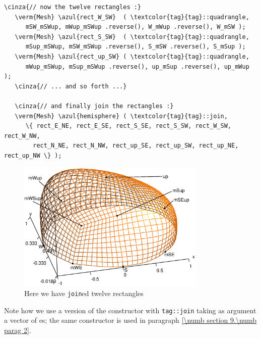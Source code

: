 \begin{Verbatim}[commandchars=\\\{\},formatcom=\small\tt,frame=single,
   label=parag-\ref{\numb section 2.\numb parag 7}.cpp,rulecolor=\color{coment},
   baselinestretch=0.94,framesep=2mm]
   \cinza{// now the twelve rectangles :}
   \verm{Mesh} \azul{rect_W_SW}  ( \textcolor{tag}{tag}::quadrangle,
      mSW_mSWup, mWup_mSWup .reverse(), W_mWup .reverse(), W_mSW );
   \verm{Mesh} \azul{rect_S_SW}  ( \textcolor{tag}{tag}::quadrangle,
      mSup_mSWup, mSW_mSWup .reverse(), S_mSW .reverse(), S_mSup );
   \verm{Mesh} \azul{rect_up_SW} ( \textcolor{tag}{tag}::quadrangle,
      mWup_mSWup, mSup_mSWup .reverse(), up_mSup .reverse(), up_mWup );
   \cinza{// ... and so forth ...}

   \cinza{// and finally join the rectangles :}
   \verm{Mesh} \azul{hemisphere} ( \textcolor{tag}{tag}::join,
      \{ rect_E_NE, rect_E_SE, rect_S_SE, rect_S_SW, rect_W_SW, rect_W_NW,
        rect_N_NE, rect_N_NW, rect_up_SE, rect_up_SW, rect_up_NE, rect_up_NW \} );
\end{Verbatim}

\begin{figure}[ht] \centering
  \includegraphics[width=90mm]{hemisphere-2}
  \caption{Here we have {\small\tt join}ed twelve rectangles}
  \label{\numb section 2.\numb fig 7}
\end{figure}

Note how we use a version of the {\small\tt {}} constructor with {\small\tt \textcolor{tag}{tag}::join}
taking as argument a vector of {\small\tt {}}es; the same constructor is used in
paragraph \ref{\numb section 9.\numb parag 2}.


